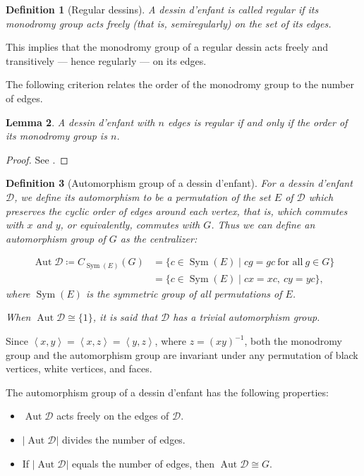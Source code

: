 \documentclass[12pt,reqno]{amsart}
\newcommand{\msD}{\mathscr{D}}
\newcommand{\ceq}{\coloneqq} 							%
\newcommand{\gen}[1]{\left\langle #1 \right\rangle}				%
\DeclareMathOperator{\Aut}{Aut}							%
\DeclareMathOperator{\Sym}{Sym}							%
\theoremstyle{mythmstyle}
\newtheorem{lemma}{Lemma}[section]
\theoremstyle{mydefstyle}
\newtheorem{definition}[lemma]{Definition}
\newcommand{\dde}{dessin d'enfant\xspace}
\newcommand{\AD}{\Aut{\msD}}
\numberwithin{equation}{section}
\begin{document}
\begin{definition}[Regular dessins]\cite[2.1.2]{Jones16}
\label{def:regular}
A \dde is called \emph{regular} if its monodromy group acts freely (that is, semiregularly) on the set of its edges.
\end{definition}

This implies that the monodromy group of a regular dessin acts freely and transitively --- hence regularly ---
on its edges.

The following criterion relates the order of the monodromy group to the number of edges.

\begin{lemma}
\label{lem:order-n}
A \dde with $n$ edges is regular if and only if the order of its monodromy group is $n$.
\end{lemma}

\begin{proof}
See \cite[Lemma~2.7]{Ohnishi26}.
\end{proof}

\vspace{-9pt}
\nopagebreak

\begin{definition}[Automorphism group of a \dde]\cite[2.1.2]{Jones16}
For a \dde $\msD$, we define its \emph{automorphism} to be a permutation of the set $E$ of $\msD$ which preserves the
cyclic order of edges around each vertex, that is, which commutes with $x$ and $y$, or equivalently, commutes with $G$.
Thus we can define an \emph{automorphism group} of $G$ as the centralizer:

\begin{align}
\Aut \msD \ceq C_{\Sym(E)}(G) &= \{ c \in \Sym(E) \mid cg = gc\ \text{for all}\ g \in G \} \\
\label{eq:cxcy}
&= \{ c \in \Sym(E) \mid cx = xc,\ cy = yc \},
\end{align}
where $\Sym(E)$ is the symmetric group of all permutations of $E$.

When $\Aut \msD \cong \{1 \}$, it is said that $\msD$ has a \emph{trivial} automorphism group.
\end{definition}

Since $\gen{x, y} = \gen{x, z} = \gen{y, z}$, where $z = (xy)^{-1}$,
both the monodromy group and the automorphism group are invariant under any permutation of black vertices,
white vertices, and faces.

The automorphism group of a \dde has the following properties:

\begin{itemize}
\item $\AD$ acts freely on the edges of $\msD$.
\item $\lvert \AD \rvert$ divides the number of edges.
\item If $\lvert \AD \rvert$ equals the number of edges, then $\AD \cong G$.
\end{itemize}
\end{document}
